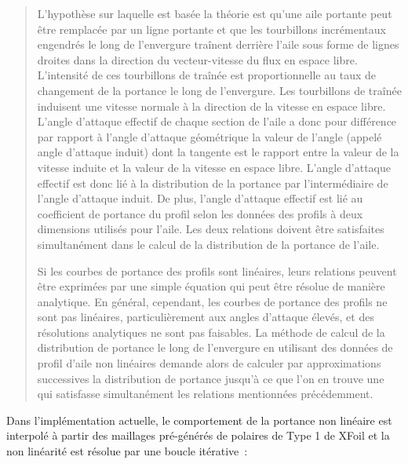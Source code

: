 \documentclass[a4paper,twoside,12pt,dvips]{article}
\begin{document}
\begin{quotation}
	L’hypothèse sur laquelle est basée la théorie est qu’une aile portante peut
	être remplacée par un ligne portante et que les tourbillons incrémentaux
	engendrés le long de l’envergure traînent derrière l’aile sous forme de 
	lignes droites dans la direction du vecteur-vitesse du flux en espace libre.
	L’intensité de ces tourbillons de traînée est proportionnelle au taux de 
	changement de la portance le long de l’envergure. Les tourbillons de traînée 
	induisent une vitesse normale à la direction de la vitesse en espace libre.
	L’angle d’attaque effectif de chaque section de l’aile a donc pour 
	différence par rapport à l’angle d’attaque géométrique la valeur de l’angle
	(appelé angle d’attaque induit) dont la tangente est le rapport entre la
	valeur de la vitesse induite et la valeur de la vitesse en espace libre. 
	L’angle d’attaque effectif est donc lié à la distribution de la portance par 
	l’intermédiaire de l’angle d’attaque induit. De plus, l’angle d’attaque 
	effectif est lié au coefficient de portance du profil selon les données des 
	profils à deux dimensions utilisés pour l’aile. Les deux relations doivent
	être satisfaites simultanément dans le calcul de la distribution de la 
	portance de l’aile.

	Si les courbes de portance des profils sont linéaires, leurs relations 
	peuvent être exprimées par une simple équation qui peut être résolue de 
	manière analytique. En général, cependant, les courbes de portance des 
	profils ne sont pas linéaires, particulièrement aux angles d’attaque élevés,
	et des résolutions analytiques ne sont pas faisables. La méthode de calcul 
	de la distribution de portance le long de l’envergure en utilisant des 
	données de profil d’aile non linéaires demande alors de calculer par 
	approximations successives la distribution de portance jusqu’à ce que l’on
	en trouve une qui satisfasse simultanément les relations mentionnées 
	précédemment.
\end{quotation}

\clearpage

Dans l’implémentation actuelle, le comportement de la portance non linéaire est
interpolé à partir des maillages pré-générés de polaires de Type 1 de XFoil et la non linéarité est résolue par une boucle itérative~:
\end{document}
